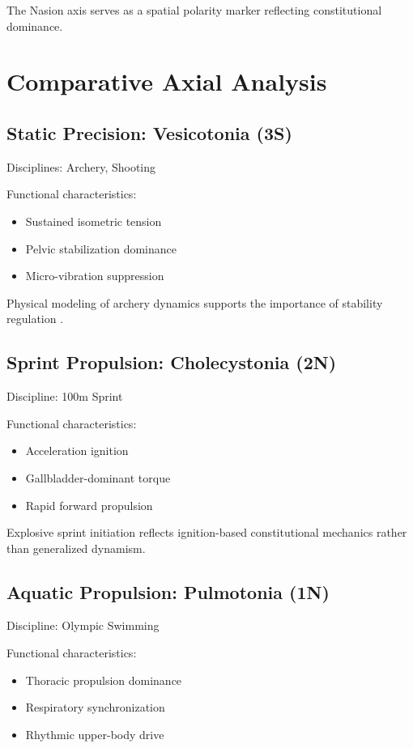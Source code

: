 \documentclass[12pt]{article}
\begin{document}
The Nasion axis serves as a spatial polarity marker reflecting constitutional dominance.

\section{Comparative Axial Analysis}

\subsection{Static Precision: Vesicotonia (3S)}

Disciplines: Archery, Shooting

Functional characteristics:
\begin{itemize}
\item Sustained isometric tension
\item Pelvic stabilization dominance
\item Micro-vibration suppression
\end{itemize}

Physical modeling of archery dynamics supports the importance of stability regulation \cite{archery_physics_meyer2015}.

\subsection{Sprint Propulsion: Cholecystonia (2N)}

Discipline: 100m Sprint

Functional characteristics:
\begin{itemize}
\item Acceleration ignition
\item Gallbladder-dominant torque
\item Rapid forward propulsion
\end{itemize}

Explosive sprint initiation reflects ignition-based constitutional mechanics rather than generalized dynamism.

\subsection{Aquatic Propulsion: Pulmotonia (1N)}

Discipline: Olympic Swimming

Functional characteristics:
\begin{itemize}
\item Thoracic propulsion dominance
\item Respiratory synchronization
\item Rhythmic upper-body drive
\end{itemize}
\end{document}

